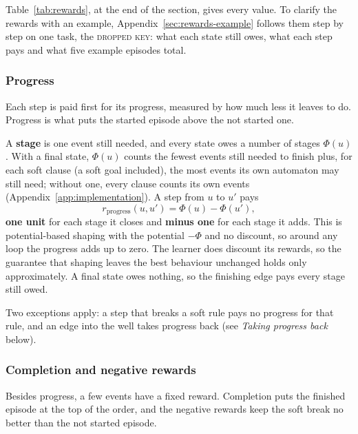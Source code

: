 \documentclass[11pt,english,listoffigures,listoftables]{tfgetsinf}
\newcommand{\runex}[1]{\textsc{#1}}  %
\newcommand{\gain}[1]{\textcolor{green!40!black}{\bfseries\boldmath #1}}  %
\newcommand{\loss}[1]{\textcolor{red!60!black}{\bfseries\boldmath #1}}  %
\begin{document}
Table~\ref{tab:rewards}, at the end of the section, gives every value. To clarify the rewards with an example, Appendix~\ref{sec:rewards-example} follows them step by step on one task, the \runex{dropped key}: what each state still owes, what each step pays and what five example episodes total.

\subsubsection{Progress}
Each step is paid first for its progress, measured by how much less it leaves to do. Progress is what puts the started episode above the not started one. 

A \textbf{stage} is one event still needed, and every state owes a number of stages $\Phi(u)$. With a final state, $\Phi(u)$ counts the fewest events still needed to finish plus, for each soft clause (a soft goal included), the most events its own automaton may still need; without one, every clause counts its own events (Appendix~\ref{app:implementation}). A step from $u$ to $u'$ pays
\[ r_{\mathrm{progress}}(u,u') = \Phi(u) - \Phi(u'), \]
\gain{one unit} for each stage it closes and \loss{minus one} for each stage it adds. This is potential-based shaping \cite{ng1999policy} with the potential $-\Phi$ and no discount, so around any loop the progress adds up to zero. The learner does discount its rewards, so the guarantee that shaping leaves the best behaviour unchanged holds only approximately. A final state owes nothing, so the finishing edge pays every stage still owed. 

Two exceptions apply: a step that breaks a soft rule pays no progress for that rule, and an edge into the well takes progress back (see \emph{Taking progress back} below).

\subsubsection{Completion and negative rewards}
Besides progress, a few events have a fixed reward. Completion puts the finished episode at the top of the order, and the negative rewards keep the soft break no better than the not started episode. 
\end{document}
